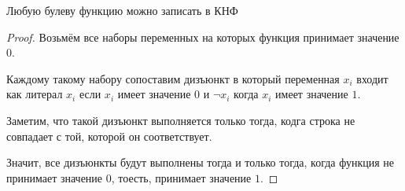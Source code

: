 \begin{theorem} \thmslashn

    Любую булеву функцию можно записать в КНФ

    \begin{proof} \thmslashn
    
        Возьмём все наборы переменных на которых функция принимает значение $0$.

        Каждому такому набору сопоставим дизъюнкт в который переменная $x_{i}$ входит как литерал $x_{i}$ если $x_{i}$ имеет значение $0$ и $\neg x_{i}$ когда $x_{i}$ имеет значение $1$.

        Заметим, что такой дизъюнкт выполняется только тогда, кодга строка не совпадает с той, которой он соответствует.

        Значит, все дизъюнкты будут выполнены тогда и только тогда, когда функция не принимает значение $0$, тоесть, принимает значение $1$.
    \end{proof}
\end{theorem}

